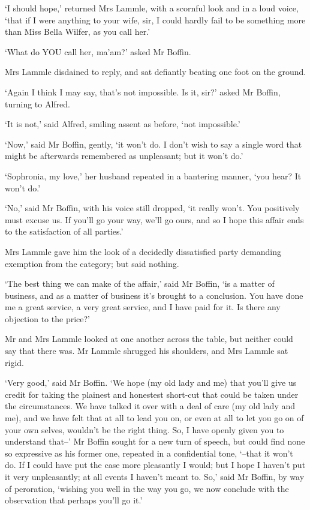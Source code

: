 ‘I should hope,’ returned Mrs Lammle, with a scornful look and in a loud
voice, ‘that if I were anything to your wife, sir, I could hardly fail
to be something more than Miss Bella Wilfer, as you call her.’

‘What do YOU call her, ma’am?’ asked Mr Boffin.

Mrs Lammle disdained to reply, and sat defiantly beating one foot on the
ground.

‘Again I think I may say, that’s not impossible. Is it, sir?’ asked Mr
Boffin, turning to Alfred.

‘It is not,’ said Alfred, smiling assent as before, ‘not impossible.’

‘Now,’ said Mr Boffin, gently, ‘it won’t do. I don’t wish to say a
single word that might be afterwards remembered as unpleasant; but it
won’t do.’

‘Sophronia, my love,’ her husband repeated in a bantering manner, ‘you
hear? It won’t do.’

‘No,’ said Mr Boffin, with his voice still dropped, ‘it really won’t.
You positively must excuse us. If you’ll go your way, we’ll go ours, and
so I hope this affair ends to the satisfaction of all parties.’

Mrs Lammle gave him the look of a decidedly dissatisfied party demanding
exemption from the category; but said nothing.

‘The best thing we can make of the affair,’ said Mr Boffin, ‘is a matter
of business, and as a matter of business it’s brought to a conclusion.
You have done me a great service, a very great service, and I have paid
for it. Is there any objection to the price?’

Mr and Mrs Lammle looked at one another across the table, but neither
could say that there was. Mr Lammle shrugged his shoulders, and Mrs
Lammle sat rigid.

‘Very good,’ said Mr Boffin. ‘We hope (my old lady and me) that you’ll
give us credit for taking the plainest and honestest short-cut that
could be taken under the circumstances. We have talked it over with a
deal of care (my old lady and me), and we have felt that at all to lead
you on, or even at all to let you go on of your own selves, wouldn’t be
the right thing. So, I have openly given you to understand that--’
Mr Boffin sought for a new turn of speech, but could find none so
expressive as his former one, repeated in a confidential tone, ‘--that
it won’t do. If I could have put the case more pleasantly I would; but
I hope I haven’t put it very unpleasantly; at all events I haven’t meant
to. So,’ said Mr Boffin, by way of peroration, ‘wishing you well in the
way you go, we now conclude with the observation that perhaps you’ll go
it.’

